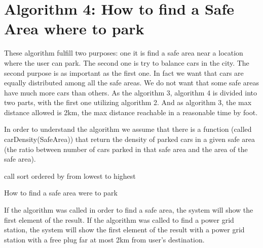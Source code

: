 \section{Algorithm 4: How to find a Safe Area where to park}
These algorithm fulfill two purposes: one it is find a safe area near a location where the user can park. The second one is try to balance cars in the city. The second purpose is as important as the first one. In fact we want that cars are equally distributed among all the safe areas. We do not want that some safe areas have much more cars than others.
As the algorithm 3, algorithm 4 is divided into two parts, with the first one utilizing algorithm 2. And as algorithm 3, the max distance allowed is 2km, the max distance reachable in a reasonable time by foot.

In order to understand the algorithm we assume that there is a function (called carDensity(SafeArea)) that return the density of parked cars in a given safe area (the ratio between number of cars parked in that safe area and the area of the safe area).

\BlankLine

\begin{algorithm}[H]


	\BlankLine
	
call \;
sort \SAS ordered by \cd{\SA} from lowest to highest\;
\Return \Res \;
\caption{How to find a safe area were to park}
\end{algorithm}
\BlankLine
\BlankLine
\BlankLine
If the algorithm was called in order to find a safe area, the system will show the first element of the result. If the algorithm was called to find a power grid station, the system will show the first element of the result with a power grid station with a free plug far at most 2km from user's destination.